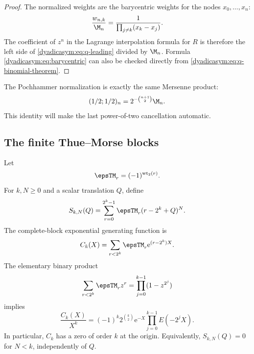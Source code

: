 \documentclass[11pt,oneside]{article}
\theoremstyle{definition}
\theoremstyle{remark}
\newcommand{\wt}{\operatorname{wt}_2}
\newcommand{\e}{\mathrm e}
\begin{document}
\begin{proof}
The normalized weights are the barycentric weights for the nodes
$x_0,\ldots,x_n$:
\begin{equation}
 \frac{w_{n,k}}{\M_n}=\frac1{\prod_{j\ne k}(x_k-x_j)}.      \label{dyadicasym:eq:barycentric}
\end{equation}
The coefficient of $z^n$ in the Lagrange interpolation formula for $R$ is therefore the left
side of \eqref{dyadicasym:eq:q-leading} divided by $\M_n$.  Formula \eqref{dyadicasym:eq:barycentric} can also be
checked directly from \eqref{dyadicasym:eq:q-binomial-theorem}.
\end{proof}

The Pochhammer normalization is exactly the same Mersenne product:
\begin{equation}
 (1/2;1/2)_n=2^{-\binom{n+1}{2}}\M_n.                      \label{dyadicasym:eq:q-mersenne}
\end{equation}
This identity will make the last power-of-two cancellation automatic.

\subsection{The finite Thue--Morse blocks}

Let
\begin{equation}
 \epsTM_r=(-1)^{\wt(r)}.                                    \label{dyadicasym:eq:tm-sign}
\end{equation}
For $k,N\ge0$ and a scalar translation $Q$, define
\begin{equation}
 S_{k,N}(Q)=\sum_{r=0}^{2^k-1}\epsTM_r(r-2^k+Q)^N.          \label{dyadicasym:eq:Skn}
\end{equation}
The complete-block exponential generating function is
\begin{equation}
 C_k(X)=\sum_{r<2^k}\epsTM_r\e^{(r-2^k)X}.                 \label{dyadicasym:eq:Ck}
\end{equation}
The elementary binary product
\begin{equation}
 \sum_{r<2^k}\epsTM_rz^r=\prod_{j=0}^{k-1}(1-z^{2^j})     \label{dyadicasym:eq:tm-product}
\end{equation}
implies
\begin{equation}
 \frac{C_k(X)}{X^k}
 =(-1)^k2^{\binom k2}\e^{-X}
   \prod_{j=0}^{k-1}E(-2^jX).                              \label{dyadicasym:eq:Ck-factor}
\end{equation}
In particular, $C_k$ has a zero of order $k$ at the origin.  Equivalently,
$S_{k,N}(Q)=0$ for $N<k$, independently of $Q$.
\end{document}
